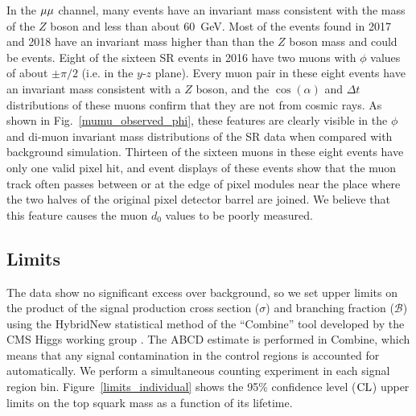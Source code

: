 In the ${\mu}{\mu}$ channel, many events have an invariant mass consistent with the mass of the $Z$ boson and \ptmiss less than about \SI{60}{\GeV}. Most of the events found in 2017 and 2018 have an invariant mass higher than than the $Z$ boson mass and could be \ttbar events. Eight of the sixteen SR events in 2016 have two muons with $\phi$ values of about $\pm\pi/2$ (i.e. in the $y$-$z$ plane). Every muon pair in these eight events have an invariant mass consistent with a $Z$ boson, and the $\cos(\alpha)$ and $\Delta t$ distributions of these muons confirm that they are not from cosmic rays. As shown in Fig.~\ref{mumu_observed_phi}, these features are clearly visible in the $\phi$ and di-muon invariant mass distributions of the SR data when compared with background simulation. Thirteen of the sixteen muons in these eight events have only one valid pixel hit, and event displays of these events show that the muon track often passes between or at the edge of pixel modules near the place where the two halves of the original pixel detector barrel are joined. We believe that this feature causes the muon $d_0$ values to be poorly measured. 



\subsection{Limits}
\label{limits}
The data show no significant excess over background, so we set upper limits on the product of the signal production cross section ($\sigma$) and branching fraction ($\mathcal{B}$) using the HybridNew statistical method of the ``Combine'' tool developed by the CMS Higgs working group \cite{Junk_CLS,Read_CLS,Cowan:2010js,CMS-NOTE-2011-005}. The ABCD estimate is performed in Combine, which means that any signal contamination in the control regions is accounted for automatically. We perform a simultaneous counting experiment in each signal region bin. Figure~\ref{limits_individual} shows the 95\% confidence level ($\text{CL}$) upper limits on the top squark mass as a function of its lifetime.

